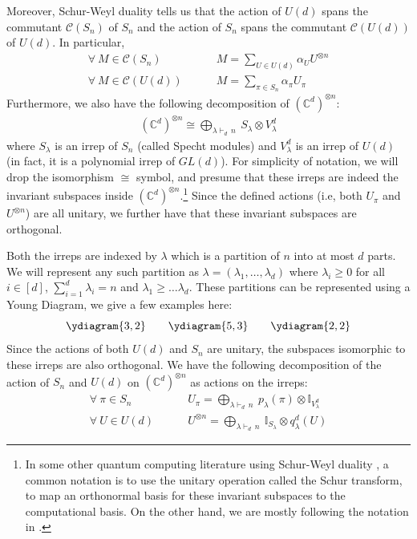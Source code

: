 \documentclass[11pt]{article}
\begin{document}
Moreover, Schur-Weyl duality \cite{fulton2013representation, etingof2011introduction} tells us that the action of $U(d)$ spans the commutant $\mathcal{C}(S_n)$ of $S_n$ and the action of $S_n$ spans the commutant $\mathcal{C}(U(d))$ of $U(d)$. In particular,
\begin{align*}
    \forall~M \in \mathcal{C}(S_n) &~~~~~~~~~~ M = \sum_{U \in U(d)} \alpha_U U^{\otimes n} \\
    \forall~M \in \mathcal{C}(U(d)) &~~~~~~~~~~ M = \sum_{\pi \in S_n} \alpha_\pi U_{\pi}
\end{align*}
Furthermore, we also have the following decomposition of $(\mathbb{C}^d)^{\otimes n}$:
\begin{align*}
    (\mathbb{C}^d)^{\otimes n} \cong \bigoplus_{\lambda\vdash_d\,n}~S_{\lambda} \otimes V_{\lambda}^d
\end{align*}
where $S_{\lambda}$ is an irrep of $S_n$ (called Specht modules) and $V^d_{\lambda}$ is an irrep of $U(d)$ (in fact, it is a polynomial irrep of $GL(d)$).  For simplicity of notation, we will drop the isomorphism $\cong$ symbol, and presume that these irreps are indeed the invariant subspaces inside $(\mathbb{C}^d)^{\otimes n}$.\footnote{In some other quantum computing literature using Schur-Weyl duality \cite{wright2016learn, harrow2005applications}, a common notation is to use the unitary operation called the Schur transform, to map an orthonormal basis for these invariant subspaces to the computational basis. On the other hand, we are mostly following the notation in \cite{bhalerao2025improvingquantumcommunicationrates}.} Since the defined actions (i.e, both $U_\pi$ and $U^{\otimes n}$) are all unitary, we further have that these invariant subspaces are orthogonal. 

Both the irreps are indexed by $\lambda$ which is a partition of $n$ into at most $d$ parts. We will represent any such partition as $\lambda = (\lambda_1, \ldots, \lambda_d)$ where $\lambda_i \geq 0$ for all $i \in [d]$, $\sum_{i=1}^d\lambda_i = n$ and $\lambda_1 \geq \ldots \lambda_d$. These partitions can be represented using a Young Diagram, we give a few examples here:
\[
\ydiagram{3,2}
\qquad
\ydiagram{5,3}
\qquad
\ydiagram{2,2}
\]
Since the actions of both $U(d)$ and $S_n$ are unitary, the subspaces isomorphic to these irreps are also orthogonal. We have the following decomposition of the action of $S_n$ and $U(d)$ on $(\mathbb{C}^d)^{\otimes n}$ as actions on the irreps:
\begin{align*}
    \forall~\pi \in S_n &~~~~~~~~~~ U_{\pi} = \bigoplus_{\lambda\vdash_d\,n}~p_{\lambda}(\pi) \otimes \mathbb{I}_{V^d_{\lambda}} \\
    \forall~U \in U(d) &~~~~~~~~~~ U^{\otimes n} = \bigoplus_{\lambda\vdash_d\,n}~\mathbb{I}_{S_{\lambda}} \otimes q^d_{\lambda}(U)
\end{align*}
\end{document}
